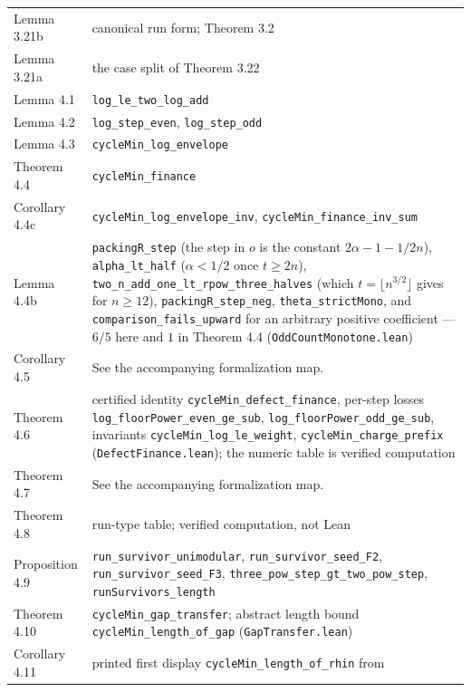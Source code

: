 \documentclass[12pt]{article}
\begin{document}
\begin{longtable}[]{@{}
  >{\raggedright\arraybackslash}p{}
  >{\raggedright\arraybackslash}p{}@{}}
Lemma 3.21b & canonical run form; Theorem 3.2 \\
Lemma 3.21a & the case split of Theorem 3.22 \\
Lemma 4.1 & \texttt{\nolinkurl{log_le_two_log_add}} \\
Lemma 4.2 & \texttt{\nolinkurl{log_step_even}},
\texttt{\nolinkurl{log_step_odd}} \\
Lemma 4.3 & \texttt{\nolinkurl{cycleMin_log_envelope}} \\
Theorem 4.4 & \texttt{\nolinkurl{cycleMin_finance}} \\
Corollary 4.4c & \texttt{\nolinkurl{cycleMin_log_envelope_inv}},
\texttt{\nolinkurl{cycleMin_finance_inv_sum}} \\
Lemma 4.4b & \texttt{\nolinkurl{packingR_step}} (the step in \(o\) is
the constant \(2\alpha-1-1/2n\)), \texttt{\nolinkurl{alpha_lt_half}}
(\(\alpha<1/2\) once \(t\ge2n\)),
\texttt{\nolinkurl{two_n_add_one_lt_rpow_three_halves}} (which
\(t=\lfloor n^{3/2}\rfloor\) gives for \(n\ge12\)),
\texttt{\nolinkurl{packingR_step_neg}},
\texttt{\nolinkurl{theta_strictMono}}, and
\texttt{\nolinkurl{comparison_fails_upward}} for an arbitrary positive
coefficient --- \(6/5\) here and \(1\) in Theorem 4.4
(\texttt{\nolinkurl{OddCountMonotone.lean}}) \\
Corollary 4.5 & See the accompanying formalization map. \\
Theorem 4.6 & certified identity
\texttt{\nolinkurl{cycleMin_defect_finance}}, per-step losses
\texttt{\nolinkurl{log_floorPower_even_ge_sub}},
\texttt{\nolinkurl{log_floorPower_odd_ge_sub}}, invariants
\texttt{\nolinkurl{cycleMin_log_le_weight}},
\texttt{\nolinkurl{cycleMin_charge_prefix}}
(\texttt{\nolinkurl{DefectFinance.lean}}); the numeric table is verified
computation \\
Theorem 4.7 & See the accompanying formalization map. \\
Theorem 4.8 & run-type table; verified computation, not Lean \\
Proposition 4.9 & \texttt{\nolinkurl{run_survivor_unimodular}},
\texttt{\nolinkurl{run_survivor_seed_F2}},
\texttt{\nolinkurl{run_survivor_seed_F3}},
\texttt{\nolinkurl{three_pow_step_gt_two_pow_step}},
\texttt{\nolinkurl{runSurvivors_length}} \\
Theorem 4.10 & \texttt{\nolinkurl{cycleMin_gap_transfer}}; abstract
length bound \texttt{\nolinkurl{cycleMin_length_of_gap}}
(\texttt{\nolinkurl{GapTransfer.lean}}) \\
Corollary 4.11 & printed first display
\texttt{\nolinkurl{cycleMin_length_of_rhin}} from

\end{longtable}
\end{document}
